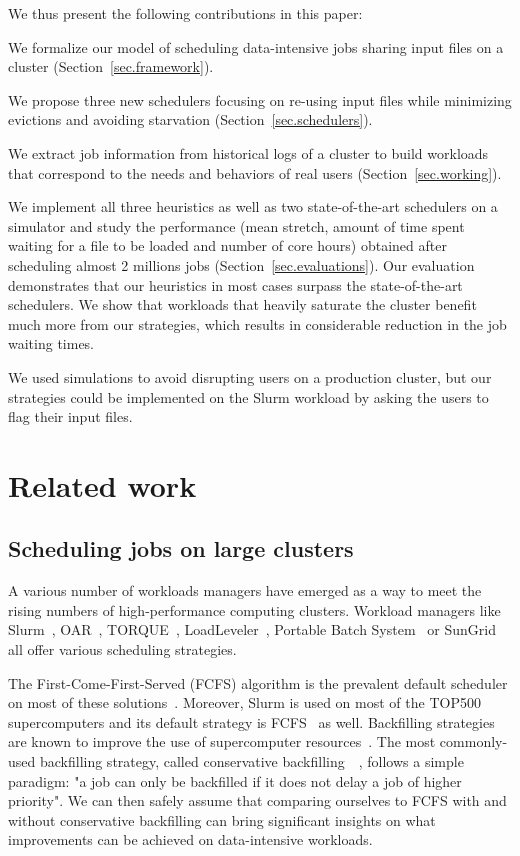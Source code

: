 \documentclass[conference]{IEEEtran}
\begin{document}
We thus present the following contributions in this paper:
\begin{compactenum}
	\item We formalize our model of scheduling data-intensive jobs sharing input files on a cluster (Section~\ref{sec.framework}).
	\item We propose three new schedulers focusing on re-using input files while minimizing evictions and avoiding starvation (Section~\ref{sec.schedulers}).
	\item We extract job information from historical logs of a cluster to build workloads that correspond to the needs and behaviors of real users (Section~\ref{sec.working}).
	\item We implement all three heuristics as well as two state-of-the-art schedulers on a simulator and study the performance (mean stretch, amount of time spent waiting for a file to be loaded and number of core hours) obtained after scheduling almost 2 millions jobs (Section~\ref{sec.evaluations}).
	Our evaluation demonstrates that our heuristics in most cases surpass the state-of-the-art schedulers.
	We show that workloads that heavily saturate the cluster
    benefit much more from our strategies, which results in
    considerable reduction in the job waiting times.
\end{compactenum}
We used simulations to avoid disrupting users on a production
cluster, but our strategies could be implemented on the Slurm workload
by asking the users to flag their input files.

\section{Related work}\label{sec.related_work}

\subsection{Scheduling jobs on large clusters}

A various number of workloads managers have emerged 
as a way to meet the rising numbers of high-performance computing clusters.
Workload managers like Slurm~\cite{SLURM}, OAR~\cite{oar},
TORQUE~\cite{torque}, LoadLeveler~\cite{loadleveler},
Portable Batch System~\cite{pbs} or SunGrid~\cite{sungrid}
all offer
various scheduling strategies.

The First-Come-First-Served (FCFS) algorithm is the prevalent default
scheduler on most of these solutions~\cite{survey_workload_manager_and_scheduler}.
Moreover, Slurm is used on most of the TOP500 supercomputers and its default strategy is FCFS~\cite{slurm_website_scheduling} as well.
Backfilling strategies are known to improve
the use of supercomputer resources~\cite{maui}. 
The most commonly-used backfilling strategy, called conservative 
backfilling~\cite{Characterization_of_Backfilling}~\cite{Introducing-New-Backfill-based}, follows
a simple paradigm: "a job can only be backfilled if it does not
delay a job of higher priority".
We can then safely assume that comparing ourselves to FCFS with and without conservative backfilling can 
bring significant insights on what improvements can be achieved on data-intensive workloads.
\end{document}
